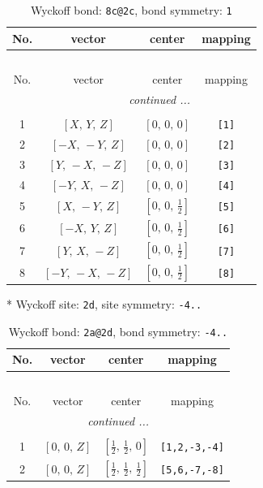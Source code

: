 \documentclass[fleqn,8pt]{jsarticle}
\begin{document}
\renewcommand{\arraystretch}{1.2}
\begin{longtable}{cccc}
\caption{Wyckoff bond: {\tt 8c@2c}, bond symmetry: {\tt 1}}
 \\
 \hline \hline
No. & vector & center & mapping \\ \hline \endfirsthead

\multicolumn{3}{l}{\tablename\ \thetable{}} \\
 \hline \hline
No. & vector & center & mapping \\ \hline \endhead

 \hline \hline
\multicolumn{3}{r}{\footnotesize\it continued ...} \\ \endfoot

 \hline \hline
\multicolumn{3}{r}{} \\ \endlastfoot

1 & $\left[ X,\, Y,\, Z \right]$ & $\left[ 0,\, 0,\, 0 \right]$ & {\tt [1]} \\ \hline
2 & $\left[ - X,\, - Y,\, Z \right]$ & $\left[ 0,\, 0,\, 0 \right]$ & {\tt [2]} \\ \hline
3 & $\left[ Y,\, - X,\, - Z \right]$ & $\left[ 0,\, 0,\, 0 \right]$ & {\tt [3]} \\ \hline
4 & $\left[ - Y,\, X,\, - Z \right]$ & $\left[ 0,\, 0,\, 0 \right]$ & {\tt [4]} \\ \hline
5 & $\left[ X,\, - Y,\, Z \right]$ & $\left[ 0,\, 0,\, \frac{1}{2} \right]$ & {\tt [5]} \\ \hline
6 & $\left[ - X,\, Y,\, Z \right]$ & $\left[ 0,\, 0,\, \frac{1}{2} \right]$ & {\tt [6]} \\ \hline
7 & $\left[ Y,\, X,\, - Z \right]$ & $\left[ 0,\, 0,\, \frac{1}{2} \right]$ & {\tt [7]} \\ \hline
8 & $\left[ - Y,\, - X,\, - Z \right]$ & $\left[ 0,\, 0,\, \frac{1}{2} \right]$ & {\tt [8]} \\
\end{longtable}
* Wyckoff site: {\tt 2d}, site symmetry: {\tt -4..}
\renewcommand{\arraystretch}{1.2}
\begin{longtable}{cccc}
\caption{Wyckoff bond: {\tt 2a@2d}, bond symmetry: {\tt -4..}}
 \\
 \hline \hline
No. & vector & center & mapping \\ \hline \endfirsthead

\multicolumn{3}{l}{\tablename\ \thetable{}} \\
 \hline \hline
No. & vector & center & mapping \\ \hline \endhead

 \hline \hline
\multicolumn{3}{r}{\footnotesize\it continued ...} \\ \endfoot

 \hline \hline
\multicolumn{3}{r}{} \\ \endlastfoot

1 & $\left[ 0,\, 0,\, Z \right]$ & $\left[ \frac{1}{2},\, \frac{1}{2},\, 0 \right]$ & {\tt [1,2,-3,-4]} \\ \hline
2 & $\left[ 0,\, 0,\, Z \right]$ & $\left[ \frac{1}{2},\, \frac{1}{2},\, \frac{1}{2} \right]$ & {\tt [5,6,-7,-8]} \\
\end{longtable}
\end{document}
